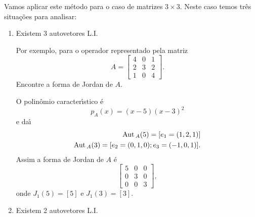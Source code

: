 Vamos aplicar este m\'etodo para o caso de matrizes $3 \times 3$. Neste caso temos tr\^es situa\c{c}\~oes para analisar:

\begin{enumerate}[label={\arabic*})]
	\item Existem 3 autovetores L.I.

	Por exemplo, para o operador representado pela matriz
	\[
		A = \begin{bmatrix}
			4 & 0 & 1\\
			2 & 3 & 2\\
			1 & 0 & 4
		\end{bmatrix}.
	\]
	Encontre a forma de Jordan de $A$.
	\begin{solucao}
		O polin\^omio caracter{\'\i}stico \'e
		\[
			p_A(x) = (x - 5)(x - 3)^2
		\]
		e da{\'\i}
		\begin{align*}
			{\rm Aut\,}_A(5) = [e_1 = (1,2,1)]\\
			{\rm Aut\,}_A(3) = [e_2 = (0,1,0); e_3 = (-1,0,1)].
		\end{align*}
		Assim a forma de Jordan de $A$ \'e
		\[
			\begin{bmatrix}
				5 & 0 & 0\\
				0 & 3 & 0\\
				0 & 0 & 3
			\end{bmatrix},
		\]
		onde $J_1(5) = [5]$ e $J_1(3) = [3]$.
	\end{solucao}
	\item Existem 2 autovetores L.I.


\end{enumerate}
